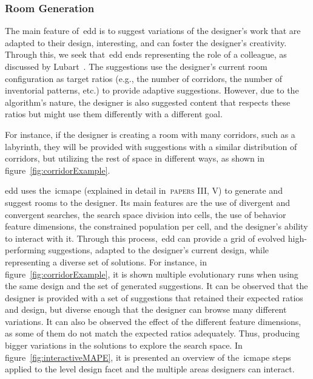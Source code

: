 
\subsubsection{Room Generation}

The main feature of~\acrshort{edd} is to suggest variations of the designer's work that are adapted to their design, interesting, and can foster the designer's creativity. Through this, we seek that~\acrshort{edd} ends representing the role of a colleague, as discussed by Lubart~\cite{lubart_how_2005}. The suggestions use the designer's current room configuration as target ratios (e.g., the number of corridors, the number of inventorial patterns, etc.) to provide adaptive suggestions. However, due to the algorithm's nature, the designer is also suggested content that respects these ratios but might use them differently with a different goal.

For instance, if the designer is creating a room with many corridors, such as a labyrinth, they will be provided with suggestions with a similar distribution of corridors, but utilizing the rest of space in different ways, as shown in figure~\ref{fig:corridorExample}.

\acrshort{edd} uses the~\acrshort{icmape} (explained in detail in~\textsc{papers III, V}) to generate and suggest rooms to the designer. Its main features are the use of divergent and convergent searches, the search space division into cells, the use of behavior feature dimensions, the constrained population per cell, and the designer's ability to interact with it. Through this process,~\acrshort{edd} can provide a grid of evolved high-performing suggestions, adapted to the designer's current design, while representing a diverse set of solutions. For instance, in figure~\ref{fig:corridorExample}, it is shown multiple evolutionary runs when using the same design and the set of generated suggestions. It can be observed that the designer is provided with a set of suggestions that retained their expected ratios and design, but diverse enough that the designer can browse many different variations. It can also be observed the effect of the different feature dimensions, as some of them do not match the expected ratios adequately. Thus, producing bigger variations in the solutions to explore the search space. In figure~\ref{fig:interactiveMAPE}, it is presented an overview of the~\acrshort{icmape} steps applied to the level design facet and the multiple areas designers can interact.


